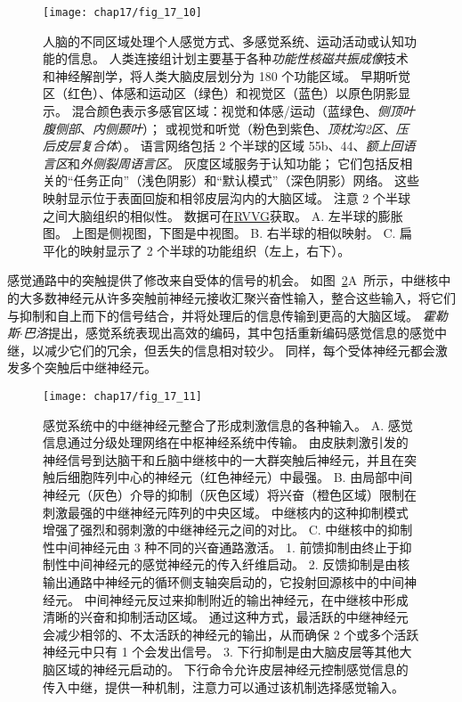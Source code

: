 \begin{figure}[htbp]
	\centering
	\texttt{[image: chap17/fig\_17\_10]}
	\caption{人脑的不同区域处理个人感觉方式、多感觉系统、运动活动或认知功能的信息。
		人类连接组计划主要基于各种\textit{功能性核磁共振成像}技术和神经解剖学，将人类大脑皮层划分为 180 个功能区域。
		早期听觉区（红色）、体感和运动区（绿色）和视觉区（蓝色）以原色阴影显示。
		混合颜色表示多感官区域：视觉和体感/运动（蓝绿色、\textit{侧顶叶腹侧部}、\textit{内侧颞叶}）；
		或视觉和听觉（粉色到紫色、\textit{顶枕沟2区}、\textit{压后皮层复合体}）。
		语言网络包括 2 个半球的区域 55b、44、\textit{额上回语言区}和\textit{外侧裂周语言区}。
		灰度区域服务于认知功能； 它们包括反相关的“任务正向”（浅色阴影）和“默认模式”（深色阴影）网络。 
		这些映射显示位于表面回旋和相邻皮层沟内的大脑区域。
		注意 2 个半球之间大脑组织的相似性\cite{glasser2016multi}。
		数据可在\href{https://balsa.wustl.edu/study/RVVG}{RVVG}获取。
		A. 左半球的膨胀图。 
		上图是侧视图，下图是中视图。
		B. 右半球的相似映射。
		C. 扁平化的映射显示了 2 个半球的功能组织（左上，右下）。}
	\label{fig:17_10}
\end{figure}


感觉通路中的突触提供了修改来自受体的信号的机会。 
如图~\ref{fig:17_11}A~所示，中继核中的大多数神经元从许多突触前神经元接收汇聚兴奋性输入，整合这些输入，将它们与抑制和自上而下的信号结合，并将处理后的信息传输到更高的大脑区域。
\textit{霍勒斯$\cdot$巴洛}提出，感觉系统表现出高效的编码，其中包括重新编码感觉信息的感觉中继，以减少它们的冗余，但丢失的信息相对较少。 
同样，每个受体神经元都会激发多个突触后中继神经元。


\begin{figure}[htbp]
	\centering
	\texttt{[image: chap17/fig\_17\_11]}
	\caption{感觉系统中的中继神经元整合了形成刺激信息的各种输入。 
		A. 感觉信息通过分级处理网络在中枢神经系统中传输。 
		由皮肤刺激引发的神经信号到达脑干和丘脑中继核中的一大群突触后神经元，并且在突触后细胞阵列中心的神经元（红色神经元）中最强\cite{biederman2013human}。
		B. 由局部中间神经元（灰色）介导的抑制（灰色区域）将兴奋（橙色区域）限制在刺激最强的中继神经元阵列的中央区域。 
		中继核内的这种抑制模式增强了强烈和弱刺激的中继神经元之间的对比。 
		C. 中继核中的抑制性中间神经元由 3 种不同的兴奋通路激活。
		1. 前馈抑制由终止于抑制性中间神经元的感觉神经元的传入纤维启动。 
		2. 反馈抑制是由核输出通路中神经元的循环侧支轴突启动的，它投射回源核中的中间神经元。
		中间神经元反过来抑制附近的输出神经元，在中继核中形成清晰的兴奋和抑制活动区域。 
		通过这种方式，最活跃的中继神经元会减少相邻的、不太活跃的神经元的输出，从而确保 2 个或多个活跃神经元中只有 1 个会发出信号。
		3. 下行抑制是由大脑皮层等其他大脑区域的神经元启动的。 
		下行命令允许皮层神经元控制感觉信息的传入中继，提供一种机制，注意力可以通过该机制选择感觉输入。}
	\label{fig:17_11}
\end{figure}


